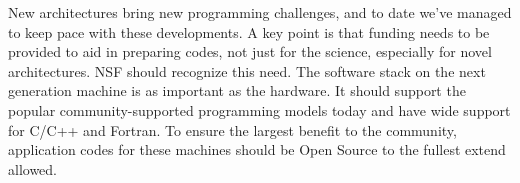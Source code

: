 \documentclass[11pt]{article}
\begin{document}
New architectures bring new programming challenges, and to date we've
managed to keep pace with these developments.  A key point is that
funding needs to be provided to aid in preparing codes, not just for
the science, especially for novel architectures.  NSF should recognize
this need.  The software stack on the next generation machine is as
important as the hardware.  It should support the popular
community-supported programming models today and have wide support for
C/C++ and Fortran.  To ensure the largest benefit to the community,
application codes for these machines should be Open Source to the
fullest extend allowed.
\end{document}
